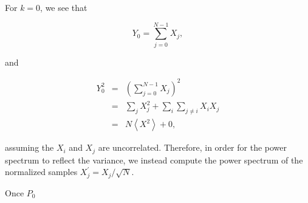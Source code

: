 For $k=0$, we see that 

\begin{equation}
Y_0 = \sum^{N-1}_{j=0}{X_j},
\end{equation}

and

\begin{eqnarray}
Y^2_0 &=& \left(\sum^{N-1}_{j=0}{X_j}\right)^2\\
 &=& \sum_j{X^2_j} + \sum_i\sum_{j\neq i}{X_iX_j}\\
 &=& N \left<X^2\right> + 0,
\end{eqnarray}

assuming the $X_i$ and $X_j$ are uncorrelated.  Therefore, in order
for the power spectrum to reflect the variance, we instead compute the
power spectrum of the normalized samples $X_j^\prime = X_j/\sqrt{N}$.

Once $P_0$
